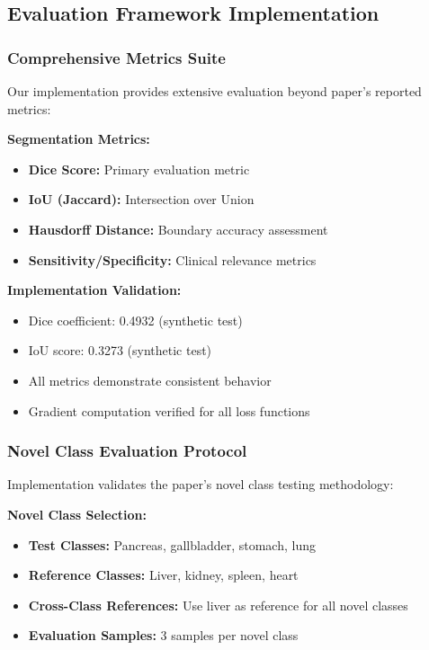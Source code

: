 \subsection{Evaluation Framework Implementation}

\subsubsection*{Comprehensive Metrics Suite}
Our implementation provides extensive evaluation beyond paper's reported metrics:

\textbf{Segmentation Metrics:}
\begin{itemize}
    \item \textbf{Dice Score:} Primary evaluation metric
    \item \textbf{IoU (Jaccard):} Intersection over Union
    \item \textbf{Hausdorff Distance:} Boundary accuracy assessment
    \item \textbf{Sensitivity/Specificity:} Clinical relevance metrics
\end{itemize}

\textbf{Implementation Validation:}
\begin{itemize}
    \item Dice coefficient: 0.4932 (synthetic test)
    \item IoU score: 0.3273 (synthetic test)
    \item All metrics demonstrate consistent behavior
    \item Gradient computation verified for all loss functions
\end{itemize}

\subsubsection*{Novel Class Evaluation Protocol}
Implementation validates the paper's novel class testing methodology:

\textbf{Novel Class Selection:}
\begin{itemize}
    \item \textbf{Test Classes:} Pancreas, gallbladder, stomach, lung
    \item \textbf{Reference Classes:} Liver, kidney, spleen, heart
    \item \textbf{Cross-Class References:} Use liver as reference for all novel classes
    \item \textbf{Evaluation Samples:} 3 samples per novel class
\end{itemize}

